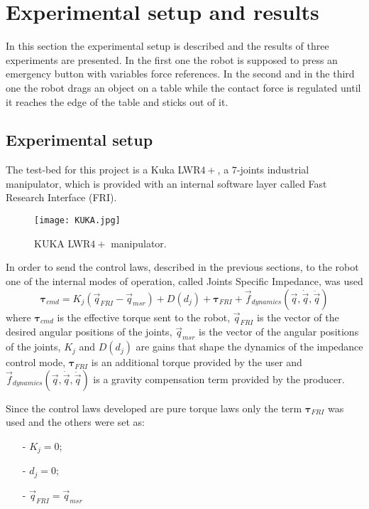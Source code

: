 \section{Experimental setup and results}
In this section the experimental setup is described and the 
results of three experiments are presented.
In the first one the robot is supposed to press an emergency button with variables
force references. In the second and in the third one the robot drags an object on a table 
while the contact force is regulated until 
it reaches the edge of the table and sticks out of it.

\subsection{Experimental setup}
The test-bed for this project is a Kuka LWR$4+$, a $7$-joints industrial manipulator, 
which is provided with an internal software layer called Fast Research Interface (FRI).
\begin{figure}[h]
  \centering
  \texttt{[image: KUKA.jpg]}
  \caption{KUKA LWR$4+$ manipulator. \label{fig:kuka_lwr}}
\end{figure}
\par
In order to send the control laws, described in the previous sections, to the robot
 one of the internal modes of operation, called Joints Specific Impedance, was used
\[
\boldsymbol{\tau}_{cmd} = K_j(\vec{q}_{FRI} - \vec{q}_{msr}) + D(d_{j}) + \boldsymbol{\tau}_{FRI} + \vec{f}_{dynamics}(\vec{q}, \dot{\vec{q}}, \ddot{\vec{q}})
\]
where $\boldsymbol{\tau}_{cmd}$ is the effective torque sent to the robot, 
$\vec{q}_{FRI}$ is the vector of the desired angular positions of the joints, 
$\vec{q}_{msr}$ is the vector of the angular positions of the joints, 
$K_j$ and $D(d_j)$ are gains that shape the dynamics of the impedance control mode,
$\boldsymbol{\tau}_{FRI}$ is an additional torque provided by the user and 
$\vec{f}_{dynamics}(\vec{q}, \dot{\vec{q}}, \ddot{\vec{q}})$ is a gravity compensation
term provided by the producer.
\par
Since the control laws developed are pure torque laws only the term
$\boldsymbol{\tau}_{FRI}$ was used and the others were set as:
\begin{itemize}
\item[-] $K_j = 0$;
\item[-] $d_j = 0$;
\item[-] $\vec{q}_{FRI} = \vec{q}_{msr}$
\end{itemize}

